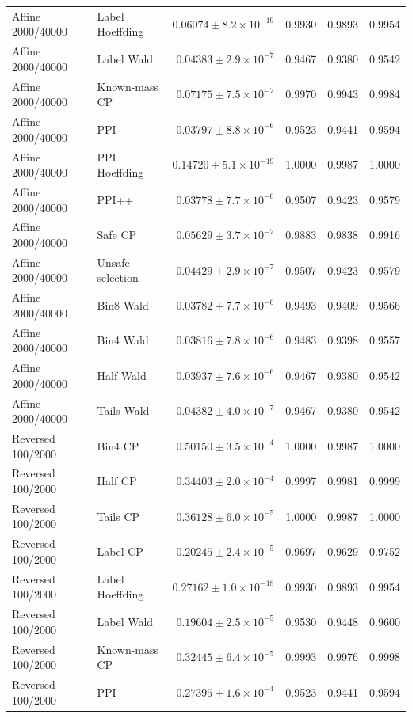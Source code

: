 \begin{longtable}{llrrrr}
Affine 2000/40000 & Label Hoeffding & $0.06074\pm 8.2\times 10^{-19}$ & 0.9930 & 0.9893 & 0.9954 \\
Affine 2000/40000 & Label Wald & $0.04383\pm 2.9\times 10^{-7}$ & 0.9467 & 0.9380 & 0.9542 \\
Affine 2000/40000 & Known-mass CP & $0.07175\pm 7.5\times 10^{-7}$ & 0.9970 & 0.9943 & 0.9984 \\
Affine 2000/40000 & PPI & $0.03797\pm 8.8\times 10^{-6}$ & 0.9523 & 0.9441 & 0.9594 \\
Affine 2000/40000 & PPI Hoeffding & $0.14720\pm 5.1\times 10^{-19}$ & 1.0000 & 0.9987 & 1.0000 \\
Affine 2000/40000 & PPI++ & $0.03778\pm 7.7\times 10^{-6}$ & 0.9507 & 0.9423 & 0.9579 \\
Affine 2000/40000 & Safe CP & $0.05629\pm 3.7\times 10^{-7}$ & 0.9883 & 0.9838 & 0.9916 \\
Affine 2000/40000 & Unsafe selection & $0.04429\pm 2.9\times 10^{-7}$ & 0.9507 & 0.9423 & 0.9579 \\
Affine 2000/40000 & Bin8 Wald & $0.03782\pm 7.7\times 10^{-6}$ & 0.9493 & 0.9409 & 0.9566 \\
Affine 2000/40000 & Bin4 Wald & $0.03816\pm 7.8\times 10^{-6}$ & 0.9483 & 0.9398 & 0.9557 \\
Affine 2000/40000 & Half Wald & $0.03937\pm 7.6\times 10^{-6}$ & 0.9467 & 0.9380 & 0.9542 \\
Affine 2000/40000 & Tails Wald & $0.04382\pm 4.0\times 10^{-7}$ & 0.9467 & 0.9380 & 0.9542 \\
Reversed 100/2000 & Bin4 CP & $0.50150\pm 3.5\times 10^{-4}$ & 1.0000 & 0.9987 & 1.0000 \\
Reversed 100/2000 & Half CP & $0.34403\pm 2.0\times 10^{-4}$ & 0.9997 & 0.9981 & 0.9999 \\
Reversed 100/2000 & Tails CP & $0.36128\pm 6.0\times 10^{-5}$ & 1.0000 & 0.9987 & 1.0000 \\
Reversed 100/2000 & Label CP & $0.20245\pm 2.4\times 10^{-5}$ & 0.9697 & 0.9629 & 0.9752 \\
Reversed 100/2000 & Label Hoeffding & $0.27162\pm 1.0\times 10^{-18}$ & 0.9930 & 0.9893 & 0.9954 \\
Reversed 100/2000 & Label Wald & $0.19604\pm 2.5\times 10^{-5}$ & 0.9530 & 0.9448 & 0.9600 \\
Reversed 100/2000 & Known-mass CP & $0.32445\pm 6.4\times 10^{-5}$ & 0.9993 & 0.9976 & 0.9998 \\
Reversed 100/2000 & PPI & $0.27395\pm 1.6\times 10^{-4}$ & 0.9523 & 0.9441 & 0.9594 \\

\end{longtable}
